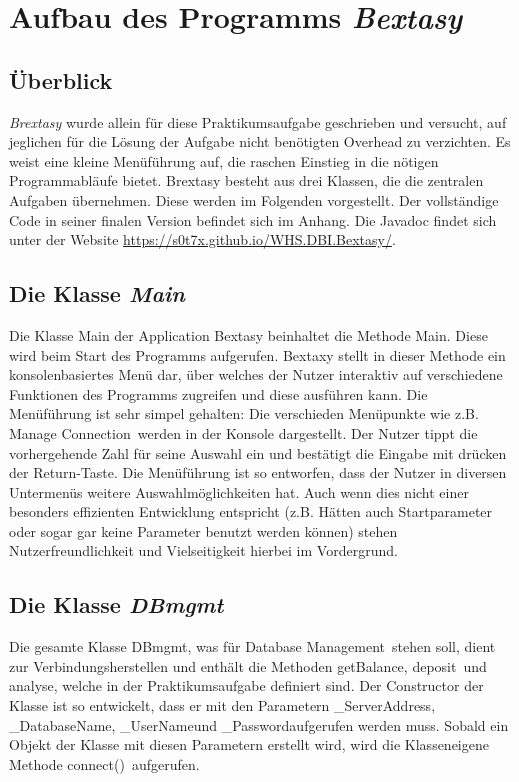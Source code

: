 \documentclass[a4paper, bibliography=totoc, 12pt]{scrartcl}
\begin{document}
\section{Aufbau des Programms \emph{Bextasy}}
	\subsection{Überblick}
		\emph{Brextasy} wurde allein für diese Praktikumsaufgabe geschrieben und versucht, auf jeglichen für die Lösung der Aufgabe nicht benötigten Overhead zu verzichten. Es weist eine kleine Menüführung auf, die raschen Einstieg in die nötigen Programmabläufe bietet.
		Brextasy besteht aus drei Klassen, die die zentralen Aufgaben übernehmen. Diese werden im Folgenden vorgestellt. Der vollständige Code in seiner finalen Version befindet sich im Anhang. Die Javadoc findet sich unter der Website \url{https://s0t7x.github.io/WHS.DBI.Bextasy/}.
	\subsection{Die Klasse \emph{Main}}
Die Klasse Main der Application Bextasy beinhaltet die Methode Main. Diese wird beim Start des Programms aufgerufen.
	Bextaxy stellt in dieser Methode ein konsolenbasiertes Menü dar, über welches der Nutzer interaktiv auf verschiedene Funktionen des Programms zugreifen und diese ausführen kann.
	Die Menüführung ist sehr simpel gehalten: Die verschieden Menüpunkte wie z.B. \glqq[1] Manage Connection\grqq\ werden in der Konsole dargestellt. Der Nutzer tippt die vorhergehende Zahl für seine Auswahl ein und bestätigt die Eingabe mit drücken der Return-Taste.
	Die Menüführung ist so entworfen, dass der Nutzer in diversen Untermenüs weitere Auswahlmöglichkeiten hat.
	Auch wenn dies nicht einer besonders effizienten Entwicklung entspricht (z.B. Hätten auch Startparameter oder sogar gar keine Parameter benutzt werden können) stehen Nutzerfreundlichkeit und Vielseitigkeit hierbei im Vordergrund.

	\subsection{Die Klasse \emph{DBmgmt}}
	Die gesamte Klasse DBmgmt, was für \glqq Database Management\grqq\ stehen soll, dient zur Verbindungsherstellen und enthält die Methoden \glqq getBalance\grqq , \glqq deposit\grqq\ und \glqq analyse\grqq , welche in der Praktikumsaufgabe definiert sind.
Der Constructor der Klasse ist so entwickelt, dass er mit den Parametern \glqq\_ServerAddress\grqq , \glqq\_DatabaseName\grqq , \glqq\_UserName\grqq und \glqq\_Password\grqq aufgerufen werden muss.
Sobald ein Objekt der Klasse mit diesen Parametern erstellt wird, wird die Klasseneigene Methode \glqq connect()\grqq\ aufgerufen.
\end{document}
